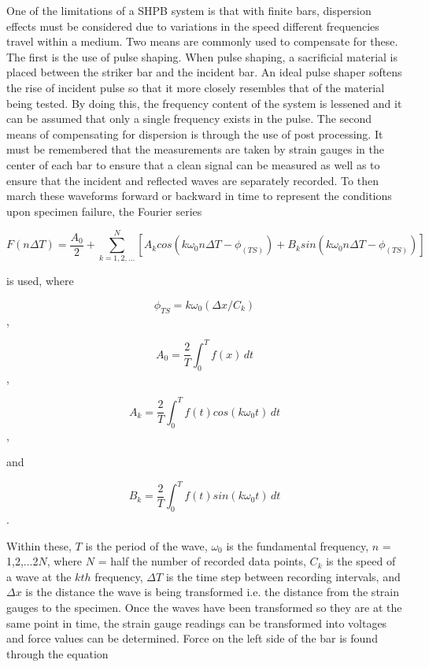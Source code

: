 \documentclass[12pt]{article}
\begin{document}
One of the limitations of a SHPB system is that with finite bars, dispersion effects must be considered due to variations in the speed different frequencies travel within a medium. Two means are commonly used to compensate for these. The first is the use of pulse shaping. When pulse shaping, a sacrificial material is placed between the striker bar and the incident bar. An ideal pulse shaper softens the rise of incident pulse so that it more closely resembles that of the material being tested. By doing this, the frequency content of the system is lessened and it can be assumed that only a single frequency exists in the pulse. The second means of compensating for dispersion is through the use of post processing. It must be remembered that the measurements are taken by strain gauges in the center of each bar to ensure that a clean signal can be measured as well as to ensure that the incident and reflected waves are separately recorded. To then march these waveforms forward or backward in time to represent the conditions upon specimen failure, the Fourier series

\begin{equation}
F(n\Delta T) = \frac{A_0}{2} + \sum\limits_{k=1,2,...}^N [A_k cos(k \omega_0 n \Delta T - \phi_(TS)) + B_k sin(k\omega_0 n\Delta T - \phi_(TS))]
\end{equation}

is used, where 

\begin{equation}
\phi_{TS} = k\omega_0(\Delta x/C_k)
\end{equation} ,

\begin{equation}
A_0 = \frac{2}{T} \int_0^T \! f(x) \, dt
\end{equation} ,

\begin{equation}
A_k = \frac{2}{T} \int_0^T \! f(t)cos(k\omega_0t) \, dt
\end{equation} ,

and

\begin{equation}
B_k = \frac{2}{T} \int_0^T \! f(t)sin(k\omega_0t) \, dt
\end{equation} .

Within these, $T$ is the period of the wave, $\omega_0$ is the fundamental frequency, $n$ = 1,2,...2$N$, where $N$ = half the number of recorded data points, $C_k$ is the speed of a wave at the $kth$ frequency, $\Delta T$ is the time step between recording intervals, and $\Delta x$ is the distance the wave is being transformed i.e. the distance from the strain gauges to the specimen. Once the waves have been transformed so they are at the same point in time, the strain gauge readings can be transformed into voltages and force values can be determined. Force on the left side of the bar is found through the equation 
\end{document}
